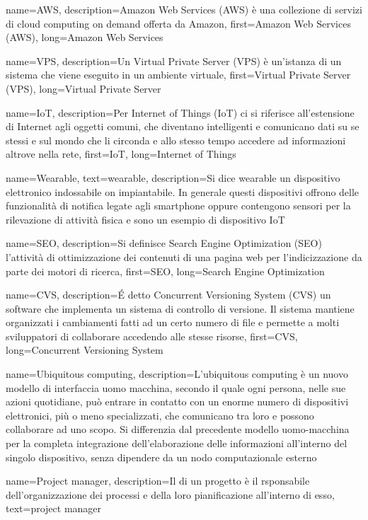 {
    name={AWS},
    description={Amazon Web Services (AWS) è una collezione di servizi di cloud computing on demand offerta da Amazon},
    first={Amazon Web Services (AWS)},
    long={Amazon Web Services}
}

{
    name={VPS},
    description={Un Virtual Private Server (VPS) è un'istanza di un sistema che viene eseguito in un ambiente virtuale},
    first={Virtual Private Server (VPS)},
    long={Virtual Private Server}
}

{
    name={IoT},
    description={Per Internet of Things (IoT) ci si riferisce all'estensione di Internet agli oggetti comuni, che diventano intelligenti e comunicano dati su se stessi e sul mondo che li circonda e allo stesso tempo accedere ad informazioni altrove nella rete},
    first={IoT},
    long={Internet of Things}
}

{
    name={Wearable},
    text={wearable},
    description={Si dice wearable un dispositivo elettronico indossabile on impiantabile. In generale questi dispositivi offrono delle funzionalità di notifica legate agli smartphone oppure contengono sensori per la rilevazione di attività fisica e sono un esempio di dispositivo \gls{IoT}}
}

{
    name={SEO},
    description={Si definisce Search Engine Optimization (SEO) l'attività di ottimizzazione dei contenuti di una pagina web per l'indicizzazione da parte dei motori di ricerca},
    first={SEO},
    long={Search Engine Optimization}
}

{
    name={CVS},
    description={É detto Concurrent Versioning System (CVS) un software che implementa un sistema di controllo di versione. Il sistema mantiene organizzati i cambiamenti fatti ad un certo numero di file e permette a molti sviluppatori di collaborare accedendo alle stesse risorse},
    first={CVS},
    long={Concurrent Versioning System}
}

{
    name={Ubiquitous computing},
    description={L'ubiquitous computing è un nuovo modello di interfaccia uomo macchina, secondo il quale ogni persona, nelle sue azioni quotidiane, può entrare in contatto con un enorme numero di dispositivi elettronici, più o meno specializzati, che comunicano tra loro e possono collaborare ad uno scopo. Si differenzia dal precedente modello uomo-macchina per la completa integrazione dell'elaborazione delle informazioni all'interno del singolo dispositivo, senza dipendere da un nodo computazionale esterno}
}

{
    name={Project manager},
    description={Il  di un progetto è il rsponsabile dell'organizzazione dei processi e della loro pianificazione all'interno di esso},
    text={project manager}
}